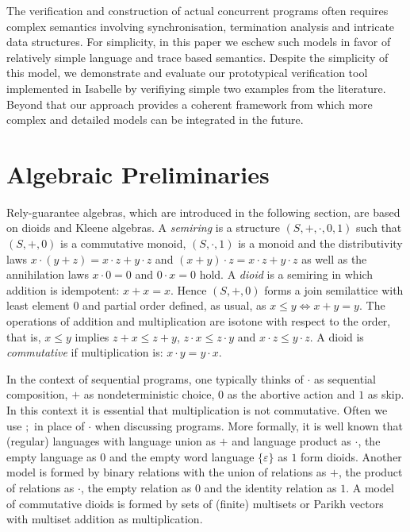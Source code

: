 \documentclass{llncs}
\begin{document}
The verification and construction of actual concurrent programs often
requires complex semantics involving synchronisation, termination
analysis and intricate data structures. For simplicity, in this paper
we eschew such models in favor of relatively simple language and trace
based semantics. Despite the simplicity of this model, we demonstrate
and evaluate our prototypical verification tool implemented in
Isabelle by verifiying simple two examples from the literature. Beyond
that our approach provides a coherent framework from which more
complex and detailed models can be integrated in the future.

\section{Algebraic Preliminaries}
\label{sec:KA}

Rely-guarantee algebras, which are introduced in the following
section, are based on dioids and Kleene algebras. A \emph{semiring} is
a structure $(S,+,\cdot,0,1)$ such that $(S,+,0)$ is a commutative
monoid, $(S,\cdot, 1)$ is a monoid and the distributivity laws $x\cdot
(y+z)=x\cdot z + y \cdot z$ and $(x+y)\cdot z = x\cdot z+y\cdot z$ as
well as the annihilation laws $x\cdot 0=0$ and $0\cdot x=0$ hold. A
\emph{dioid} is a semiring in which addition is idempotent:
$x+x=x$. Hence $(S,+,0)$ forms a join semilattice with least element
$0$ and partial order defined, as usual, as $x\le y\Leftrightarrow
x+y=y$. The operations of addition and multiplication are isotone with
respect to the order, that is, $x \le y $ implies $z+x\le z+y$,
$z\cdot x \le z\cdot y$ and $x\cdot z \le y\cdot z$. A dioid is
\emph{commutative} if multiplication is: $x\cdot y = y \cdot x$.

In the context of sequential programs, one typically thinks of $\cdot$
as sequential composition, $+$ as nondeterministic choice, $0$ as the
abortive action and $1$ as skip. In this context it is essential that
multiplication is not commutative. Often we use $;$ in place of
$\cdot$ when discussing programs. More formally, it is well known that
(regular) languages with language union as $+$ and language product as
$\cdot$, the empty language as $0$ and the empty word language
$\{\varepsilon\}$ as $1$ form dioids. Another model is formed by
binary relations with the union of relations as $+$, the product of
relations as $\cdot$, the empty relation as $0$ and the identity
relation as $1$. A model of commutative dioids is formed by sets of
(finite) multisets or Parikh vectors with multiset addition as
multiplication.
\end{document}
